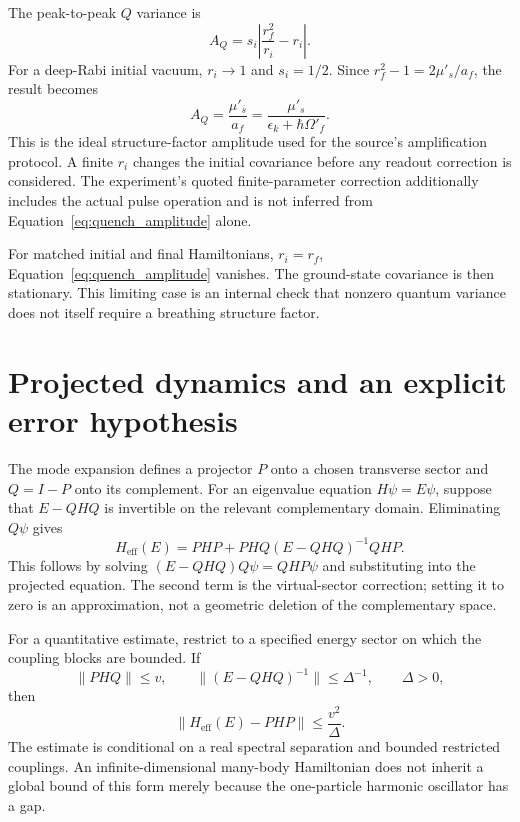 \documentclass[11pt,a4paper]{article}
\theoremstyle{definition}
\theoremstyle{remark}
\newcommand{\musp}{\mu'_s}
\begin{document}
The peak-to-peak $Q$ variance is
\begin{equation}
 A_Q=s_i\left|\frac{r_f^2}{r_i}-r_i\right|.
 \label{eq:quench_amplitude}
\end{equation}
For a deep-Rabi initial vacuum, $r_i\to1$ and $s_i=1/2$. Since $r_f^2-1=2\musp/a_f$, the result becomes
\begin{equation}
 A_Q=\frac{\musp}{a_f}
 =\frac{\musp}{\epsilon_k+\hbar\Omega'_f}.
 \label{eq:quench_source}
\end{equation}
This is the ideal structure-factor amplitude used for the source's amplification protocol. A finite $r_i$ changes the initial covariance before any readout correction is considered. The experiment's quoted finite-parameter correction additionally includes the actual pulse operation and is not inferred from Equation~\eqref{eq:quench_amplitude} alone.\cite{zhang2026}

For matched initial and final Hamiltonians, $r_i=r_f$, Equation~\eqref{eq:quench_amplitude} vanishes. The ground-state covariance is then stationary. This limiting case is an internal check that nonzero quantum variance does not itself require a breathing structure factor.

\section{Projected dynamics and an explicit error hypothesis}
\label{app:projection}
The mode expansion defines a projector $P$ onto a chosen transverse sector and $Q=I-P$ onto its complement. For an eigenvalue equation $H\psi=E\psi$, suppose that $E-QHQ$ is invertible on the relevant complementary domain. Eliminating $Q\psi$ gives
\begin{equation}
 H_{\mathrm{eff}}(E)
 =PHP+PHQ(E-QHQ)^{-1}QHP.
 \label{eq:schur}
\end{equation}
This follows by solving $(E-QHQ)Q\psi=QHP\psi$ and substituting into the projected equation. The second term is the virtual-sector correction; setting it to zero is an approximation, not a geometric deletion of the complementary space.

For a quantitative estimate, restrict to a specified energy sector on which the coupling blocks are bounded. If
\begin{equation}
 \|PHQ\|\leq v,\qquad
 \|(E-QHQ)^{-1}\|\leq\Delta^{-1},\qquad \Delta>0,
 \label{eq:projection_assumptions}
\end{equation}
then
\begin{equation}
 \|H_{\mathrm{eff}}(E)-PHP\|\leq\frac{v^2}{\Delta}.
 \label{eq:projection_error}
\end{equation}
The estimate is conditional on a real spectral separation and bounded restricted couplings. An infinite-dimensional many-body Hamiltonian does not inherit a global bound of this form merely because the one-particle harmonic oscillator has a gap.
\end{document}

